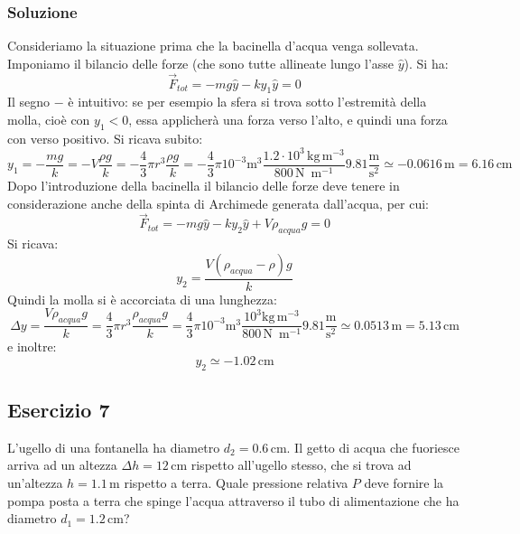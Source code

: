 \documentclass[12pt,a4paper]{book}
\begin{document}
\subsubsection*{Soluzione}
Consideriamo la situazione prima che la bacinella d'acqua venga sollevata. 
Imponiamo il bilancio delle forze (che sono tutte allineate lungo l'asse $\hat{y}$). Si ha:
\begin{equation*}
\vec{F}_{tot}= - m g \hat{y} - k y_1 \hat{y} = 0
\end{equation*}
Il segno $-$ è intuitivo: se per esempio la sfera si trova sotto l'estremità della molla, cioè con $y_1<0$, essa applicherà una forza verso l'alto, e quindi una forza con verso positivo. Si ricava subito:
\begin{equation*}
y_1=-\frac{mg}{k}=-V\frac{\rho g}{k}=-\frac{4}{3}\pi r^3 \frac{\rho g}{k} =- \frac{4}{3}\pi 10^{-3} \text{m}^3 \frac{1.2 \cdot 10^3 \, \text{kg} \, \text{m}^{-3}}{800 \, \text{N } \, \text{m}^{-1}}  9.81 \frac{\text{m}}{\text{s}^2} \simeq -0.0616 \, \text{m}= 6.16 \, \text{cm} 
\end{equation*}
Dopo l'introduzione della bacinella il bilancio delle forze deve tenere in considerazione anche della spinta di Archimede generata dall'acqua, per cui:
\begin{equation*}
\vec{F}_{tot}= - m g \hat{y} - k y_2 \hat{y} + V \rho_{acqua} g= 0
\end{equation*}
Si ricava:
\begin{equation*}
y_2=\frac{V(\rho_{acqua}- \rho)g}{k}
\end{equation*}
Quindi la molla si è accorciata di una lunghezza:
\begin{equation*}
\Delta y= \frac{V \rho_{acqua} g}{k}= \frac{4}{3}\pi r^3 \frac{ \rho_{acqua} g}{k}= \frac{4}{3}\pi 10^{-3} \text{m}^3 \frac{10^3 \text{kg} \, \text{m}^{-3}}{800 \, \text{N } \, \text{m}^{-1}}  9.81 \frac{\text{m}}{\text{s}^2} \simeq 0.0513 \, \text{m}= 5.13 \, \text{cm} 
\end{equation*}
e inoltre:
\begin{equation*}
y_2 \simeq-1.02 \, \text{cm} 
\end{equation*}

\subsection*{Esercizio 7}
L'ugello di una fontanella ha diametro $d_2=0.6 \,$cm. Il getto di acqua che fuoriesce arriva ad un altezza $\Delta h=12\,$cm rispetto all'ugello stesso, che si trova ad un'altezza $h=1.1\,$m rispetto a terra. Quale pressione relativa $P$ deve fornire la pompa posta a terra che spinge l'acqua attraverso il tubo di alimentazione che ha diametro $d_1=1.2 \,$cm?
\end{document}
